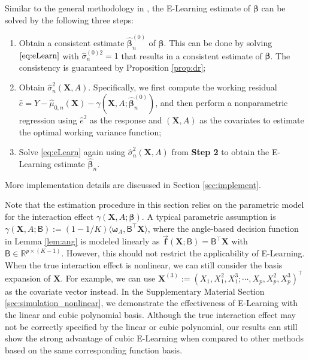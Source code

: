 \documentclass[11pt]{article}
\theoremstyle{definition}
\theoremstyle{remark}
\newcommand{\bbf}{\bm{f}}
\newcommand{\bX}{\bm{X}}
\newcommand{\bbeta}{\bm{\beta}}
\newcommand{\bomega}{\bm{\omega}}
\newcommand{\bbR}{\mathbb{R}}
\newcommand{\sfB}{\mathsf{B}}
\begin{document}
Similar to the general methodology in \citet{davidian1987variance}, the E-Learning estimate of $ \bbeta $ can be solved by the following three steps:
\begin{enumerate}[label=\textbf{Step \arabic*.}]
	\item Obtain a consistent estimate $ \widehat{\bbeta}_{n}^{(0)} $ of $ \bbeta $. This can be done by solving $ \eqref{eq:eLearn} $ with $ \widehat{\sigma}_{n}^{(0)2} = 1 $ that results in a consistent estimate of $ \bbeta $. The consistency is guaranteed by Proposition \ref{prop:dr}; 
	
	\item \label{enum:var} Obtain $ \widehat{\sigma}_{n}^{2}(\bX,A) $. Specifically, we first compute the working residual $ \widehat{e} = Y - \widehat{\mu}_{0,n}(\bX) - \gamma(\bX,A;\widehat{\bbeta}_{n}^{(0)}) $, and then
	perform a nonparametric regression using $ \widehat{e}^{2} $ as the response and $(\bX,A)$ as the covariates to estimate the optimal working variance function;
	
	\item Solve \eqref{eq:eLearn} again using $ \widehat{\sigma}_{n}^{2}(\bX,A) $ from \textbf{Step 2} to obtain the E-Learning estimate $ \widehat{\bbeta}_{n} $.  
\end{enumerate}
More implementation details are discussed in Section \ref{sec:implement}. 

Note that the estimation procedure in this section relies on the parametric model for the interaction effect $ \gamma(\bX,A;\bbeta) $. A typical parametric assumption is $ \gamma(\bX,A;\sfB) := (1-1/K)\langle \bomega_{A},\sfB^{\intercal}\bX \rangle $, where the angle-based decision function in Lemma \ref{lem:ang} is modeled linearly as $ \vec{\bbf}(\bX;\sfB) = \sfB^{\intercal}\bX $ with $ \sfB \in \bbR^{p\times(K-1)} $. However, this should not restrict the applicability of E-Learning. When the true interaction effect is nonlinear, we can still consider the basis expansion of $ \bX $. For example, we can use $ \bX^{(3)} := (X_{1},X_{1}^{2},X_{1}^{3};\cdots,X_{p},X_{p}^{2},X_{p}^{3})^{\intercal} $ as the covariate vector instead. In the Supplementary Material Section \ref{sec:simulation_nonlinear}, we demonstrate the effectiveness of E-Learning with the linear and cubic polynomial basis. Although the true interaction effect may not be correctly specified by the linear or cubic polynomial, our results can still show the strong advantage of cubic E-Learning when compared to other methods based on the same corresponding function basis.
\end{document}
